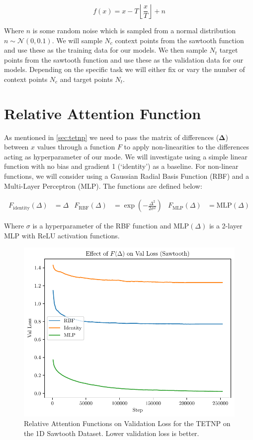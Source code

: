 \documentclass[../../main.tex]{subfiles}
\begin{document}
\begin{equation}
	f(x) = x - T \left\lfloor \frac{x}{T} \right\rfloor + n
\end{equation}

Where $n$ is some random noise which is sampled from a normal distribution $n \sim \mathcal{N}(0, 0.1)$.
We will sample $N_c$ context points from the sawtooth function and use these as the training data for our models. We then sample $N_t$ target points from the sawtooth function and use these as the validation data for our models. Depending on the specific task we will either fix or vary the number of context points $N_c$ and target points $N_t$.


\section{Relative Attention Function}

As mentioned in \autoref{sec:tetnp} we need to pass the matrix of differences ($\bm{\Delta}$) between $x$ values through a function $F$ to apply non-linearities to the differences acting as hyperparameter of our mode. We will investigate using a simple linear function with no bias and gradient 1 (`identity') as a baseline. For non-linear functions, we will consider using a Gaussian Radial Basis Function (RBF) and a Multi-Layer Perceptron (MLP). The functions are defined below:

\begin{align}
	F_{\text{identity}}(\Delta) &= \Delta&
	F_{\text{RBF}}(\Delta) &= \exp\left(-\frac{\Delta^2}{2\sigma^2}\right)&
	F_{\text{MLP}}(\Delta) &= \text{MLP}(\Delta)
\end{align}

Where $\sigma$ is a hyperparameter of the RBF function and $\text{MLP}(\Delta)$ is a 2-layer MLP with ReLU activation functions.

\begin{figure}[H]
	\centering
	\includegraphics[width=0.6\linewidth]{./F-on-loss.pdf}
	\caption{Relative Attention Functions on Validation Loss for the TETNP on the 1D Sawtooth Dataset. Lower validation loss is better.}
	\label{fig:relative-attn-func-1d}
\end{figure}
\end{document}
